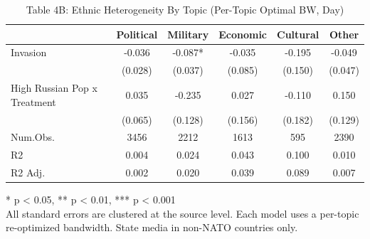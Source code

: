 \begin{table}[!t]
\caption{Table 4B: Ethnic Heterogeneity By Topic (Per-Topic Optimal BW, Day)} 
\fontsize{12.0pt}{14.4pt}\selectfont
\begin{tabular*}{\linewidth}{@{\extracolsep{\fill}}lccccc}
\toprule
  & Political & Military & Economic & Cultural & Other \\ 
\midrule\addlinespace[2.5pt]
Invasion & -0.036 & -0.087* & -0.035 & -0.195 & -0.049 \\ 
 & (0.028) & (0.037) & (0.085) & (0.150) & (0.047) \\ 
High Russian Pop x Treatment & 0.035 & -0.235 & 0.027 & -0.110 & 0.150 \\ 
{} & {(0.065)} & {(0.128)} & {(0.156)} & {(0.182)} & {(0.129)} \\ 
Num.Obs. & 3456 & 2212 & 1613 & 595 & 2390 \\ 
R2 & 0.004 & 0.024 & 0.043 & 0.100 & 0.010 \\ 
R2 Adj. & 0.002 & 0.020 & 0.039 & 0.089 & 0.007 \\ 
\bottomrule
\end{tabular*}
\begin{minipage}{\linewidth}
* p < 0.05, ** p < 0.01, *** p < 0.001\\
All standard errors are clustered at the source level. Each model uses a
per-topic re-optimized bandwidth. State media in non-NATO countries only.\\
\end{minipage}
\end{table}

